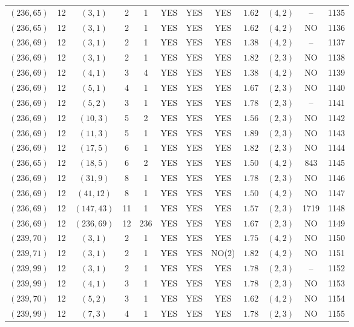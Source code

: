 \begin{longtable}{|c|c|c|c|c|c|c|c|c|c|c|c|}
$(236,65)$ & 12 & $(3,1)$ & 2 & 1 & YES & YES & YES & $1.62$ & $(4,2)$ & -- & 1135\\
$(236,65)$ & 12 & $(3,1)$ & 2 & 1 & YES & YES & YES & $1.62$ & $(4,2)$ & NO & 1136\\
$(236,69)$ & 12 & $(3,1)$ & 2 & 1 & YES & YES & YES & $1.38$ & $(4,2)$ & -- & 1137\\
$(236,69)$ & 12 & $(3,1)$ & 2 & 1 & YES & YES & YES & $1.82$ & $(2,3)$ & NO & 1138\\
$(236,69)$ & 12 & $(4,1)$ & 3 & 4 & YES & YES & YES & $1.38$ & $(4,2)$ & NO & 1139\\
$(236,69)$ & 12 & $(5,1)$ & 4 & 1 & YES & YES & YES & $1.67$ & $(2,3)$ & NO & 1140\\
$(236,69)$ & 12 & $(5,2)$ & 3 & 1 & YES & YES & YES & $1.78$ & $(2,3)$ & -- & 1141\\
$(236,69)$ & 12 & $(10,3)$ & 5 & 2 & YES & YES & YES & $1.56$ & $(2,3)$ & NO & 1142\\
$(236,69)$ & 12 & $(11,3)$ & 5 & 1 & YES & YES & YES & $1.89$ & $(2,3)$ & NO & 1143\\
$(236,69)$ & 12 & $(17,5)$ & 6 & 1 & YES & YES & YES & $1.82$ & $(2,3)$ & NO & 1144\\
$(236,65)$ & 12 & $(18,5)$ & 6 & 2 & YES & YES & YES & $1.50$ & $(4,2)$ & 843 & 1145\\
$(236,69)$ & 12 & $(31,9)$ & 8 & 1 & YES & YES & YES & $1.78$ & $(2,3)$ & NO & 1146\\
$(236,69)$ & 12 & $(41,12)$ & 8 & 1 & YES & YES & YES & $1.50$ & $(4,2)$ & NO & 1147\\
$(236,69)$ & 12 & $(147,43)$ & 11 & 1 & YES & YES & YES & $1.57$ & $(2,3)$ & 1719 & 1148\\
$(236,69)$ & 12 & $(236,69)$ & 12 & 236 & YES & YES & YES & $1.67$ & $(2,3)$ & NO & 1149\\
$(239,70)$ & 12 & $(3,1)$ & 2 & 1 & YES & YES & YES & $1.75$ & $(4,2)$ & NO & 1150\\
$(239,71)$ & 12 & $(3,1)$ & 2 & 1 & YES & YES & NO(2) & $1.82$ & $(4,2)$ & NO & 1151\\
$(239,99)$ & 12 & $(3,1)$ & 2 & 1 & YES & YES & YES & $1.78$ & $(2,3)$ & -- & 1152\\
$(239,99)$ & 12 & $(4,1)$ & 3 & 1 & YES & YES & YES & $1.78$ & $(2,3)$ & NO & 1153\\
$(239,70)$ & 12 & $(5,2)$ & 3 & 1 & YES & YES & YES & $1.62$ & $(4,2)$ & NO & 1154\\
$(239,99)$ & 12 & $(7,3)$ & 4 & 1 & YES & YES & YES & $1.78$ & $(2,3)$ & NO & 1155\\

\end{longtable}
